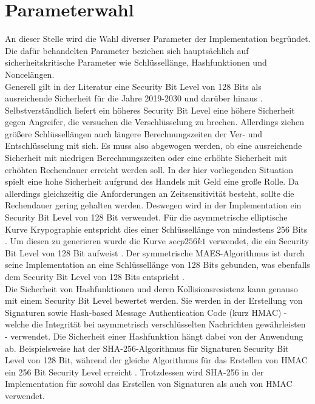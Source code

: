 \documentclass{scrreprt}
\begin{document}
\section{Parameterwahl}
An dieser Stelle wird die Wahl diverser Parameter der Implementation begründet. Die dafür behandelten Parameter beziehen sich hauptsächlich auf sicherheitskritische Parameter wie Schlüssellänge, Hashfunktionen und Noncelängen.\\
Generell gilt in der Literatur eine Security Bit Level von 128 Bits als ausreichende Sicherheit für die Jahre 2019-2030 und darüber hinaus \cite{elaine2016recommendation}. Selbstverständlich liefert ein höheres Security Bit Level eine höhere Sicherheit gegen Angreifer, die versuchen die Verschlüsselung zu brechen. Allerdings ziehen größere Schlüssellängen auch längere Berechnungszeiten der Ver- und Entschlüsselung mit sich. Es muss also abgewogen werden, ob eine ausreichende Sicherheit mit niedrigen Berechnungszeiten oder eine erhöhte Sicherheit mit erhöhten Rechendauer erreicht werden soll. In der hier vorliegenden Situation spielt eine hohe Sicherheit aufgrund des Handels mit Geld eine große Rolle. Da allerdings gleichzeitig die Anforderungen an Zeitsensitivität besteht, sollte die Rechendauer gering gehalten werden. Deswegen wird in der Implementation ein Security Bit Level von 128 Bit verwendet. Für die asymmetrische elliptische Kurve Krypographie entspricht dies einer Schlüssellänge von mindestens 256 Bits \cite{elaine2016recommendation,bsi2020cryptographic}. Um diesen zu generieren wurde die Kurve $secp256k1$ verwendet, die ein Security Bit Level von 128 Bit aufweist \cite{ecc-duka2020elliptic}. Der symmetrische MAES-Algorithmus ist durch seine Implementation an eine Schlüssellänge von 128 Bits gebunden, was ebenfalls dem Security Bit Level von 128 Bits entspricht \cite{elaine2016recommendation}.\\



Die Sicherheit von Hashfunktionen und deren Kollisionsresistenz kann genauso mit einem Security Bit Level bewertet werden. Sie werden in der Erstellung von Signaturen sowie Hash-based Message Authentication Code (kurz HMAC) - welche die Integrität bei asymmetrisch verschlüsselten Nachrichten gewährleisten - verwendet. Die Sicherheit einer Hashfunktion hängt dabei von der Anwendung ab. Beispielsweise hat der SHA-256-Algorithmus für Signaturen Security Bit Level von 128 Bit, während der gleiche Algorithmus für das Erstellen von HMAC ein 256 Bit Security Level erreicht \cite{elaine2016recommendation}. Trotzdessen wird SHA-256 in der Implementation für sowohl das Erstellen von Signaturen als auch von HMAC verwendet.\\
\end{document}
